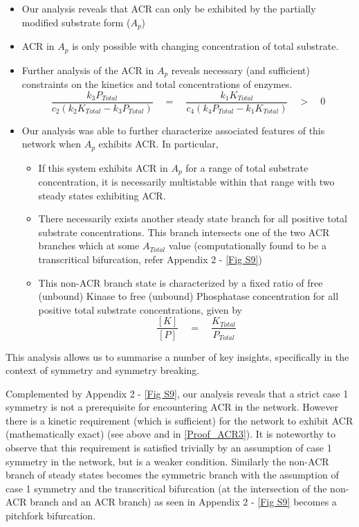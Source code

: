 \documentclass[9pt,lineno]{elife}
\begin{document}
\begin{appendixbox}
\begin{itemize}
    \item Our analysis reveals that ACR can only be exhibited by the partially modified substrate form ($A_p$)
    \item ACR in $A_p$ is only possible with changing concentration of total substrate.
    \item Further analysis of the ACR in $A_p$ reveals necessary (and sufficient) constraints on the kinetics and total concentrations of enzymes.
    $$\frac{k_3P_{Total}}{c_2\left(k_2K_{Total}-k_3P_{Total}\right)} \quad = \quad \frac{k_1K_{Total}}{c_4\left(k_4P_{Total}-k_1K_{Total}\right)} \quad > \quad 0 $$
    \item Our analysis was able to further characterize associated features of this network when $A_p$ exhibits ACR. In particular, 
    \begin{itemize}
        \item If this system exhibits ACR in $A_p$ for a range of total substrate concentration, it is necessarily multistable within that range with two steady states exhibiting ACR.
    \item There necessarily exists another steady state branch for all positive total substrate concentrations. This branch intersects one of the two ACR branches which at some $A_{Total}$ value (computationally found to be a transcritical bifurcation, refer Appendix 2 - \cref{Fig S9}) 
    \item This non-ACR branch state is  characterized by a fixed ratio of free (unbound) Kinase to free (unbound) Phosphatase concentration for all positive total substrate concentrations, given by 
    $$ \frac{[K]}{[P]} \quad = \quad \frac{K_{Total}}{P_{Total}} $$
    \end{itemize}
\end{itemize}

This analysis allows us to summarise a number of key insights, specifically in the context of symmetry and symmetry breaking. 

Complemented by Appendix 2 - \cref{Fig S9}, our analysis reveals that a strict case 1 symmetry is not a prerequisite for encountering ACR in the network. However there is a kinetic requirement (which is sufficient) for the network to exhibit  ACR (mathematically exact) (see above and in \cref{Proof_ACR3}). It is noteworthy to observe that this requirement is satisfied trivially by an assumption of case 1 symmetry in the network, but is a weaker condition. Similarly the non-ACR branch of steady states becomes the symmetric branch with the assumption of case 1 symmetry and the transcritical bifurcation (at the intersection of the non-ACR branch and an ACR branch) as seen in Appendix 2 - \cref{Fig S9} becomes a pitchfork bifurcation.


\end{appendixbox}
\end{document}
